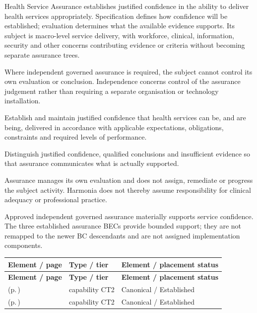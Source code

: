 Health Service Assurance establishes justified confidence in the ability to deliver health services appropriately. Specification defines how confidence will be established; evaluation determines what the available evidence supports. Its subject is macro-level service delivery, with workforce, clinical, information, security and other concerns contributing evidence or criteria without becoming separate assurance trees.


Where independent governed assurance is required, the subject cannot control its own evaluation or conclusion. Independence concerns control of the assurance judgement rather than requiring a separate organisation or technology installation.



Establish and maintain justified confidence that health services can be, and are being, delivered in accordance with applicable expectations, obligations, constraints and required levels of performance.



Distinguish justified confidence, qualified conclusions and insufficient evidence so that assurance communicates what is actually supported.



Assurance manages its own evaluation and does not assign, remediate or progress the subject activity. Harmonia does not thereby assume responsibility for clinical adequacy or professional practice.



Approved independent governed assurance materially supports service confidence. The three established assurance BECs provide bounded support; they are not remapped to the newer BC descendants and are not assigned implementation components.


\begingroup\small\setlength{\TableWidth}{\dimexpr\linewidth-6\tabcolsep-4\arrayrulewidth\relax}
\begin{longtable}{|>{\raggedright\arraybackslash}p{0.52\TableWidth}|>{\raggedright\arraybackslash}p{0.2\TableWidth}|>{\raggedright\arraybackslash}p{0.28\TableWidth}|}
\hline\rowcolor{TableHead}\textbf{Element / page} & \textbf{Type / tier} & \textbf{Element / placement status}\\\hline\endfirsthead
\hline\rowcolor{TableHead}\textbf{Element / page} & \textbf{Type / tier} & \textbf{Element / placement status}\\\hline\endhead
\hline\endfoot
\nameref{cap:bc-health-service-assurance-specification} (p.\,\pageref{cap:bc-health-service-assurance-specification}) & capability CT2 & Canonical / Established\\\hline
\nameref{cap:bc-assurance-evaluation} (p.\,\pageref{cap:bc-assurance-evaluation}) & capability CT2 & Canonical / Established\\\hline
\end{longtable}\endgroup

